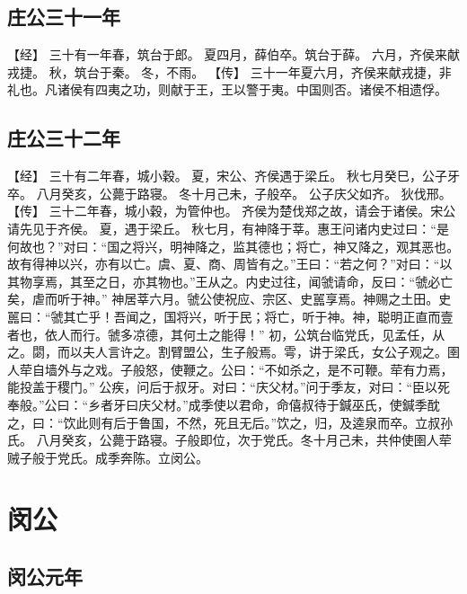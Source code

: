 \documentclass[a4paper,12pt,UTF8,twoside]{ctexbook}
\begin{document}
\section{庄公三十一年}

【经】
三十有一年春，筑台于郎。
夏四月，薛伯卒。筑台于薛。
六月，齐侯来献戎捷。
秋，筑台于秦。
冬，不雨。
【传】
三十一年夏六月，齐侯来献戎捷，非礼也。凡诸侯有四夷之功，则献于王，王以警于夷。中国则否。诸侯不相遗俘。

\section{庄公三十二年}

【经】
三十有二年春，城小穀。
夏，宋公、齐侯遇于梁丘。
秋七月癸巳，公子牙卒。
八月癸亥，公薨于路寝。
冬十月己未，子般卒。
公子庆父如齐。
狄伐邢。
【传】
三十二年春，城小穀，为管仲也。
齐侯为楚伐郑之故，请会于诸侯。宋公请先见于齐侯。
夏，遇于梁丘。
秋七月，有神降于莘。惠王问诸内史过曰：“是何故也？”对曰：“国之将兴，明神降之，监其德也；将亡，神又降之，观其恶也。故有得神以兴，亦有以亡。虞、夏、商、周皆有之。”王曰：“若之何？”对曰：“以其物享焉，其至之日，亦其物也。”王从之。内史过往，闻虢请命，反曰：“虢必亡矣，虐而听于神。”
神居莘六月。虢公使祝应、宗区、史嚚享焉。神赐之土田。史嚚曰：“虢其亡乎！吾闻之，国将兴，听于民；将亡，听于神。神，聪明正直而壹者也，依人而行。虢多凉德，其何土之能得！”
初，公筑台临党氏，见孟任，从之。閟，而以夫人言许之。割臂盟公，生子般焉。雩，讲于梁氏，女公子观之。圉人荦自墙外与之戏。子般怒，使鞭之。公曰：“不如杀之，是不可鞭。荦有力焉，能投盖于稷门。”
公疾，问后于叔牙。对曰：“庆父材。”问于季友，对曰：“臣以死奉般。”公曰：“乡者牙曰庆父材。”成季使以君命，命僖叔待于鍼巫氏，使鍼季酖之，曰：“饮此则有后于鲁国，不然，死且无后。”饮之，归，及逵泉而卒。立叔孙氏。
八月癸亥，公薨于路寝。子般即位，次于党氏。冬十月己未，共仲使圉人荦贼子般于党氏。成季奔陈。立闵公。

\chapter{闵公}

\section{闵公元年}
\end{document}
